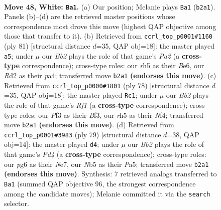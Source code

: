 \documentclass[11pt]{article}
\begin{document}
\clearpage

\begin{figure}[p]\centering
\begin{subfigure}{0.46\textwidth}\centering
\resizebox{\linewidth}{!}{%
\newchessgame
\chessboard[
  setfen={8/1p2p1k1/n5pp/pN5r/P1p5/2P2PK1/1B1R4/8 w - - 1 48},
  showmover=false,
  pgfstyle=straightmove, color=movearrow, markmove={b2-a1}
]}
\caption{}
\end{subfigure}\hfill
\begin{subfigure}{0.46\textwidth}\centering
\resizebox{\linewidth}{!}{%
\newchessgame
\chessboard[
  setfen={8/p1kp4/4b3/2p5/P1P2R2/2P1K1P1/2PN3r/8 b - - 3 41},
  showmover=false,
  pgfstyle=straightmove, color=movearrow, markmove={a7-a5}
]}
\caption{}
\end{subfigure}
\\[4pt]
\begin{subfigure}{0.46\textwidth}\centering
\resizebox{\linewidth}{!}{%
\newchessgame
\chessboard[
  setfen={5rk1/6np/3p2p1/1n1P2P1/2p1PN2/5BPK/8/5R2 w - - 2 40},
  showmover=false,
  pgfstyle=straightmove, color=movearrow, markmove={f1-c1}
]}
\caption{}
\end{subfigure}\hfill
\begin{subfigure}{0.46\textwidth}\centering
\resizebox{\linewidth}{!}{%
\newchessgame
\chessboard[
  setfen={4k3/4n2p/R5p1/p1Pp2P1/P7/1Pb4P/5KP1/8 b - - 10 40},
  showmover=false,
  pgfstyle=straightmove, color=movearrow, markmove={d5-d4}
]}
\caption{}
\end{subfigure}
\caption{\textbf{Move 48, White: \texttt{Ba1}.} (a) Our position; Melanie plays \texttt{Ba1} (\texttt{b2a1}). Panels (b)--(d) are the retrieved master positions whose correspondence most drove this move (highest QAP objective among those that transfer to it). (b) Retrieved from \texttt{ccrl\_top\_p0001\#1160} (ply 81) [structural distance $d$=35, QAP obj=18]: the master played \texttt{a5}; under $\mu$ our \emph{Bb2} plays the role of that game's \emph{Pa2} (a \textbf{cross-type} correspondence); cross-type roles: our \emph{r}h5 as their \emph{B}e6, our \emph{R}d2 as their \emph{p}a4; transferred move \texttt{b2a1} \textbf{(endorses this move)}. (c) Retrieved from \texttt{ccrl\_top\_p0000\#1801} (ply 78) [structural distance $d$=35, QAP obj=18]: the master played \texttt{Rc1}; under $\mu$ our \emph{Bb2} plays the role of that game's \emph{Rf1} (a \textbf{cross-type} correspondence); cross-type roles: our \emph{P}f3 as their \emph{B}f3, our \emph{r}h5 as their \emph{N}f4; transferred move \texttt{b2a1} \textbf{(endorses this move)}. (d) Retrieved from \texttt{ccrl\_top\_p0001\#3983} (ply 79) [structural distance $d$=38, QAP obj=14]: the master played \texttt{d4}; under $\mu$ our \emph{Bb2} plays the role of that game's \emph{Pd4} (a \textbf{cross-type} correspondence); cross-type roles: our \emph{p}g6 as their \emph{N}e7, our \emph{N}b5 as their \emph{P}a5; transferred move \texttt{b2a1} \textbf{(endorses this move)}. Synthesis: 7 retrieved analogs transferred to \texttt{Ba1} (summed QAP objective 96, the strongest correspondence among the candidate moves); Melanie committed it via the \texttt{search} selector.}
\label{fig:thought-m94}
\end{figure}
\end{document}

